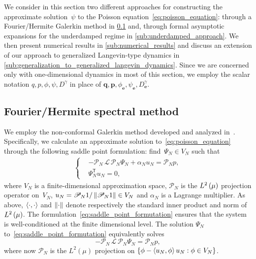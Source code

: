 \documentclass[11pt,a4paper]{article}
\newcommand{\vect}[1]{\boldsymbol{\mathbf #1}}
\renewcommand{\t}{\mathsf T}
\theoremstyle{plain}
\numberwithin{equation}{section}
\begin{document}
We consider in this section two different approaches for constructing the approximate solution~$\psi$ to the Poisson equation~\eqref{eq:poisson_equation}:
through a Fourier/Hermite Galerkin method in \cref{sub:galerkin_approach} and,
through formal asymptotic expansions for the underdamped regime in \cref{sub:underdamped_approach}.
We then present numerical results in \cref{sub:numerical_results}
and discuss an extension of our approach to generalized Langevin-type dynamics in \cref{sub:generalization_to_generalized_langevin_dynamics}.
Since we are concerned only with one-dimensional dynamics in most of this section,
we employ the scalar notation $q, p, \phi, \psi, D^{\gamma}$ in place of $\vect q, \vect p, \phi_{\vect e}, \psi_{\vect e}, D^{\gamma}_{\vect e}$.

\subsection{Fourier/Hermite spectral method}%
\label{sub:galerkin_approach}
We employ the non-conformal Galerkin method developed and analyzed in~\cite{roussel2018spectral}.
Specifically, we calculate an approximate solution to~\eqref{eq:poisson_equation} through the following saddle point formulation:
find~$\Psi_N \in V_N$ such that
\begin{align}
  \label{eq:saddle_point_formutation}
  \left\{
    \begin{aligned}
       & - \mathscr P_N \, \mathcal L \, \mathscr P_N \Psi_N + \alpha_N u_N = \mathscr P_N p, \\
       & \Psi_N^\t u_N = 0,
    \end{aligned}
  \right.
\end{align}
where $V_N$ is a finite-dimensional approximation space,
$\mathscr P_N$ is the $\lp{2}{\mu}$ projection operator on~$V_N$,
$u_N = \mathscr P_N 1 / \norm{\mathscr P_N 1} \in V_N$
and $\alpha_N$ is a Lagrange multiplier.
As above,
$\ip{\cdot}{\cdot}$ and $\norm{\cdot}$ denote respectively the standard inner product and norm of $\lp{2}{\mu}$.
The formulation~\eqref{eq:saddle_point_formutation} ensures
that the system is well-conditioned at the finite dimensional level.
The solution $\Psi_N$ to~\eqref{eq:saddle_point_formutation} equivalently solves
\[
    - \mathcal P_N \, \mathcal L \, \mathcal P_N \Psi_N = \mathcal P_N p,
\]
where now $\mathcal P_N$ is the $L^2(\mu)$ projection on $\{\phi - \ip{u_N}{\phi} u_N : \phi \in V_N\}$.
\end{document}
